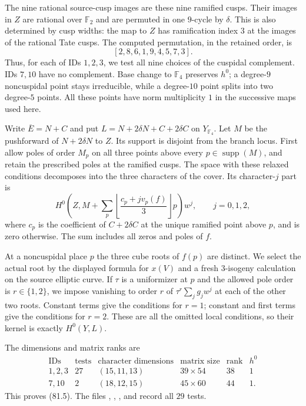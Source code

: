 The nine rational source-cusp images are these nine ramified cusps.
Their images in $Z$ are rational over $\mathbb F_2$ and are permuted
in one $9$-cycle by $\delta$. This is also determined by cusp widths:
the map to $Z$ has ramification index $3$ at the images of the
rational Tate cusps. The computed permutation, in the retained order,
is
\[
                  [2,8,6,1,9,4,5,7,3].
\]
Thus, for each of IDs $1,2,3$, we test all nine choices of the
cuspidal complement. IDs $7,10$ have no complement. Base change to
$\mathbb F_4$ preserves $h^0$; a degree-$9$ noncuspidal point stays
irreducible, while a degree-$10$ point splits into two degree-$5$
points. All these points have norm multiplicity $1$ in the successive
maps used here.

Write $\overline E=N+C$ and put
$L=N+2\delta N+C+2\delta C$ on $Y_{\mathbb F_4}$. Let $M$ be the
pushforward of $N+2\delta N$ to $Z$. Its support is disjoint from the
branch locus. First allow poles of order $M_p$ on all three points
above every $p\in\operatorname{supp}(M)$, and retain the prescribed
poles at the ramified cusps. The space with these relaxed conditions
decomposes into the three characters of the cover. Its character-$j$
part is
\[
 H^0\left(Z,M+
       \sum_p\left\lfloor\frac{c_p+jv_p(f)}3\right\rfloor p\right)w^j,
       \qquad j=0,1,2,                                  \tag{81.7}
\]
where $c_p$ is the coefficient of $C+2\delta C$ at the unique
ramified point above $p$, and is zero otherwise. The sum includes
all zeros and poles of $f$.

At a noncuspidal place $p$ the three cube roots of $f(p)$ are
distinct. We select the actual root by the displayed formula for
$x(V)$ and a fresh $3$-isogeny calculation on the source elliptic
curve. If $\tau$ is a uniformizer at $p$ and the allowed pole order
is $r\in\{1,2\}$, we impose vanishing to order $r$ of
$\tau^r\sum_jg_jw^j$ at each of the other two roots. Constant terms
give the conditions for $r=1$; constant and first terms give the
conditions for $r=2$. These are all the omitted local conditions, so
their kernel is exactly $H^0(Y,L)$.

The dimensions and matrix ranks are
\[
\begin{array}{c|c|c|c|c|c}
 \text{IDs}&\text{tests}&\text{character dimensions}
       &\text{matrix size}&\text{rank}&h^0\\ \hline
 1,2,3&27&(15,11,13)&39\times54&38&1\\
 7,10&2 &(18,12,15)&45\times60&44&1.
\end{array}
\]
This proves (81.5). The files ,
, ,
 and  record all
$29$ tests.

